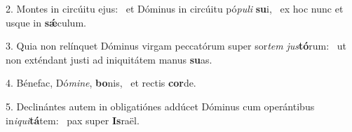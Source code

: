 2. Montes in circúitu ejus: \dag\  et Dóminus in circúitu pó\textit{pu}\textit{li} \textbf{su}i, \ast\  ex hoc nunc et usque in \textbf{sǽ}culum.\

3. Quia non relínquet Dóminus virgam peccatórum super sor\textit{tem} \textit{jus}\textbf{tó}rum: \ast\  ut non exténdant justi ad iniquitátem manus \textbf{su}as.\

4. Bénefac, Dó\textit{mi}\textit{ne}, \textbf{bo}nis, \ast\  et rectis \textbf{cor}de.\

5. Declinántes autem in obligatiónes addúcet Dóminus cum operántibus in\textit{i}\textit{qui}\textbf{tá}tem: \ast\  pax super \textbf{Is}raël.\

